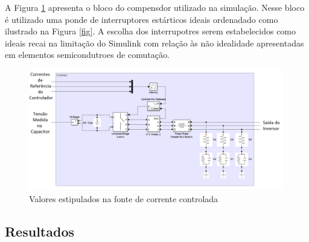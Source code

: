 A Figura \ref{fig:Inversor.png} apresenta o bloco do compensdor utilizado na simulação. Nesse bloco é utilizado uma ponde de interruptores estárticos ideais ordenadado como ilustrado na Figura \ref{fig}. A escolha dos interrupotres serem estabelecidos como ideais recai na limitação do Simulink com relação às não idealidade apresentadas em elementos semicondutroes de comutação.
 
\begin{figure}[!htb] %
	\centering
	\includegraphics[width=0.99\textwidth]{Cap4/Figuras/Inversor.png}
	\caption{Valores estipulados na fonte de corrente controlada}
	\label{fig:Inversor.png}
\end{figure}

\subsection{Resultados}
